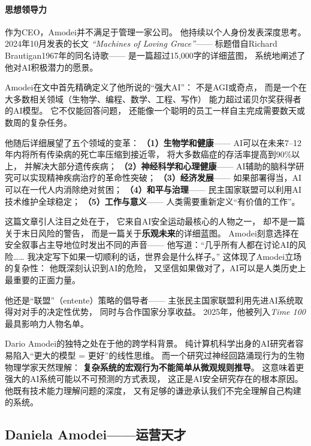 \paragraph{思想领导力}
作为CEO，Amodei并不满足于管理一家公司。
他持续以个人身份发表深度思考。
2024年10月发表的长文
\textit{``Machines of Loving Grace''}——
标题借自Richard Brautigan1967年的同名诗歌——
是一篇超过15,000字的详细蓝图，
系统地阐述了他对AI积极潜力的愿景。

Amodei在文中首先精确定义了他所说的``强大AI''：
不是AGI或奇点，
而是一个在大多数相关领域（生物学、编程、数学、工程、写作）
能力超过诺贝尔奖获得者的AI模型。
它不仅能回答问题，
还能像一个聪明的员工一样自主完成需要数天或数周的复杂任务。

他随后详细展望了五个领域的变革：
\textbf{（1）生物学和健康}——
AI可以在未来7--12年内将所有传染病的死亡率压缩到接近零，
将大多数癌症的存活率提高到90\%以上，
并解决大部分遗传疾病；
\textbf{（2）神经科学和心理健康}——
AI辅助的脑科学研究可以实现精神疾病治疗的革命性突破；
\textbf{（3）经济发展}——
如果部署得当，AI可以在一代人内消除绝对贫困；
\textbf{（4）和平与治理}——
民主国家联盟可以利用AI技术维护全球稳定；
\textbf{（5）工作与意义}——
人类需要重新定义``有价值的工作''。

这篇文章引人注目之处在于，
它来自AI安全运动最核心的人物之一，
却不是一篇关于末日风险的警告，
而是一篇关于\textbf{乐观未来}的详细蓝图。
Amodei刻意选择在安全叙事占主导地位时发出不同的声音——
他写道：``几乎所有人都在讨论AI的风险……
我决定写下如果一切顺利的话，世界会是什么样子。''
这体现了Amodei立场的复杂性：
他既深刻认识到AI的危险，
又坚信如果做对了，AI可以是人类历史上最重要的正面力量。

他还是``联盟''（entente）策略的倡导者——
主张民主国家联盟利用先进AI系统取得对对手的决定性优势，
同时与合作国家分享收益。
2025年，他被列入\textit{Time 100}最具影响力人物名单。

\begin{whybox}[为什么一个生物物理学家成了最好的AI安全CEO？]
Dario Amodei的独特之处在于他的跨学科背景。
纯计算机科学出身的AI研究者容易陷入``更大的模型 = 更好''的线性思维。
而一个研究过神经回路涌现行为的生物物理学家天然理解：
\textbf{复杂系统的宏观行为不能简单从微观规则推导}。
这意味着更强大的AI系统可能以不可预测的方式表现，
这正是AI安全研究存在的根本原因。
他既有技术能力理解问题的深度，
又有足够的谦逊承认我们不完全理解自己构建的系统。
\end{whybox}

\subsection{Daniela Amodei——运营天才}
\label{subsec:daniela}

